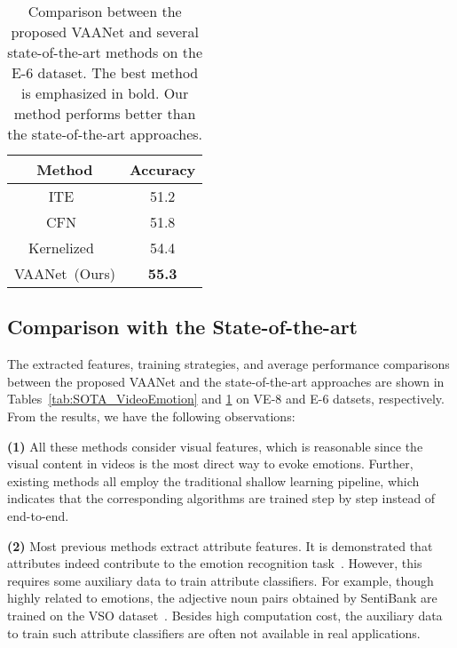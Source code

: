 \documentclass[letterpaper]{article} \usepackage{aaai20}  \usepackage{times}  \usepackage{helvet} \usepackage{courier}  \usepackage[hyphens]{url}  \usepackage{graphicx} \urlstyle{rm} \def\UrlFont{\rm}  \usepackage{graphicx}
\begin{document}
\begin{table}[!t]
\centering \caption{Comparison between the proposed VAANet and several state-of-the-art methods on the E-6 dataset. The best method is emphasized in bold. Our method performs better than the state-of-the-art approaches.}
\begin{tabular}{c c}
\toprule
Method & Accuracy\\\hline
ITE~\cite{xu2018heterogeneous}                   &     51.2    \\
CFN~\cite{chen2016emotion}                       &    51.8     \\
Kernelized~\cite{zhang2018recognition}           &    54.4     \\
VAANet~(Ours)                                    &     \textbf{55.3}    \\
\bottomrule
\end{tabular}
\label{tab:SOTA_Ekman}
\end{table}










\subsection{Comparison with the State-of-the-art}
\label{ssec:Comparison}

The extracted features, training strategies,  and average performance comparisons between the proposed VAANet and the state-of-the-art approaches are shown in Tables~\ref{tab:SOTA_VideoEmotion} and \ref{tab:SOTA_Ekman} on VE-8 and E-6 datsets, respectively. From the results, we have the following observations:

\textbf{(1)} All these methods consider visual features, which is reasonable since the visual content in videos is the most direct way to evoke emotions. Further, existing methods all employ the traditional shallow learning pipeline, which indicates that the corresponding algorithms are trained step by step instead of end-to-end.


\textbf{(2)} Most previous methods extract attribute features. It is demonstrated that attributes indeed contribute to the emotion recognition task~\cite{chen2016emotion}. However, this requires some auxiliary data to train attribute classifiers. For example, though highly related to emotions, the adjective noun pairs obtained by SentiBank are trained on the VSO dataset~\cite{borth2013sentibank}. Besides high computation cost, the auxiliary data to train such attribute classifiers are often not available in real applications.
\end{document}
